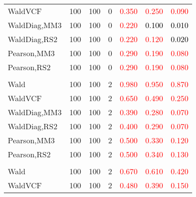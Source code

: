 \documentclass[
]{article}
\begin{document}
\begin{table}[H]
{\begin{tabular}[t]{lrrrrrr}
\hspace{1em}WaldVCF & 100 & 100 & 0 & \textcolor{red}{0.350} & \textcolor{red}{0.250} & \textcolor{red}{0.090}\\
\hspace{1em}WaldDiag,MM3 & 100 & 100 & 0 & \textcolor{red}{0.220} & \textcolor{black}{0.100} & \textcolor{black}{0.010}\\
\hspace{1em}WaldDiag,RS2 & 100 & 100 & 0 & \textcolor{red}{0.220} & \textcolor{red}{0.120} & \textcolor{black}{0.020}\\
\hspace{1em}Pearson,MM3 & 100 & 100 & 0 & \textcolor{red}{0.290} & \textcolor{red}{0.190} & \textcolor{red}{0.080}\\
\hspace{1em}Pearson,RS2 & 100 & 100 & 0 & \textcolor{red}{0.290} & \textcolor{red}{0.190} & \textcolor{red}{0.080}\\
\addlinespace[0.3em]
\multicolumn{7}{l}{\textbf{1F 15V}}\\
\hspace{1em}Wald & 100 & 100 & 2 & \textcolor{red}{0.980} & \textcolor{red}{0.950} & \textcolor{red}{0.870}\\
\hspace{1em}WaldVCF & 100 & 100 & 2 & \textcolor{red}{0.650} & \textcolor{red}{0.490} & \textcolor{red}{0.250}\\
\hspace{1em}WaldDiag,MM3 & 100 & 100 & 2 & \textcolor{red}{0.390} & \textcolor{red}{0.280} & \textcolor{red}{0.070}\\
\hspace{1em}WaldDiag,RS2 & 100 & 100 & 2 & \textcolor{red}{0.400} & \textcolor{red}{0.290} & \textcolor{red}{0.070}\\
\hspace{1em}Pearson,MM3 & 100 & 100 & 2 & \textcolor{red}{0.500} & \textcolor{red}{0.330} & \textcolor{red}{0.120}\\
\hspace{1em}Pearson,RS2 & 100 & 100 & 2 & \textcolor{red}{0.500} & \textcolor{red}{0.340} & \textcolor{red}{0.130}\\
\addlinespace[0.3em]
\multicolumn{7}{l}{\textbf{2F 10V}}\\
\hspace{1em}Wald & 100 & 100 & 2 & \textcolor{red}{0.670} & \textcolor{red}{0.610} & \textcolor{red}{0.420}\\
\hspace{1em}WaldVCF & 100 & 100 & 2 & \textcolor{red}{0.480} & \textcolor{red}{0.390} & \textcolor{red}{0.150}\\

\end{tabular}}
\end{table}
\end{document}
